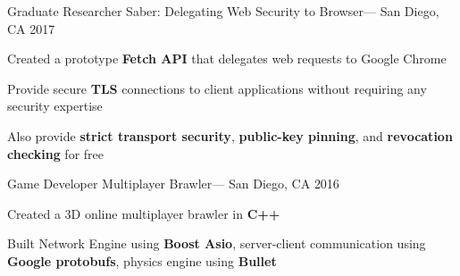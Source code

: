


\begin{cventries}


\cventry
{Graduate Researcher} %
{Saber: Delegating Web Security to Browser---} %
{San Diego, CA} %
{2017} %
{ %
\begin{cvitems}
\item{Created a prototype \textbf{Fetch API} that delegates web requests to Google Chrome}
\item{Provide secure \textbf{TLS} connections to client applications without requiring any security expertise}
\item{Also provide \textbf{strict transport security}, \textbf{public-key pinning}, and \textbf{revocation checking} for free}
\end{cvitems}
}


\cventry
{Game Developer} %
{Multiplayer Brawler---} %
{San Diego, CA} %
{2016} %
{ %
\begin{cvitems}
\item{Created a 3D online multiplayer brawler in \textbf{C++}}
\item{Built Network Engine using \textbf{Boost Asio}, server-client communication using \textbf{Google protobufs}, physics engine using \textbf{Bullet}}
\end{cvitems}
}


\end{cventries}
